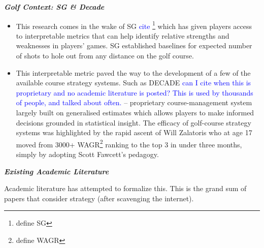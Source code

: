 \documentclass[11pt, letterpaper]{article}
\begin{document}
\textbf{\emph{Golf Context: SG \& Decade}}

\begin{itemize}
    \item This research comes in the wake of SG \textcolor{blue}{cite} \footnote{define SG} which has given players access to interpretable metrics that can help identify relative strengths and weaknesses in players' games. SG established baselines for expected number of shots to hole out from any distance on the golf course.  
    \item This interpretable metric paved the way to the development of a few of the available course strategy systems. Such as DECADE \textcolor{blue}{can I cite when this is proprietary and no academic literature is posted? This is used by thousands of people, and talked about often.} – proprietary course-management system largely built on generalised estimates which allows players to make informed decisions grounded in statistical insight. The efficacy of golf-course strategy systems was highlighted by the rapid ascent of Will Zalatoris who at age 17 moved from 3000+ WAGR\footnote{define WAGR} ranking to the top 3 in under three months, simply by adopting Scott Fawcett's pedagogy.
\end{itemize}

\textbf{\emph{Existing Academic Literature}}

Academic literature has attempted to formalize this. This is the grand sum of papers that consider strategy (after scavenging the internet).
\end{document}
